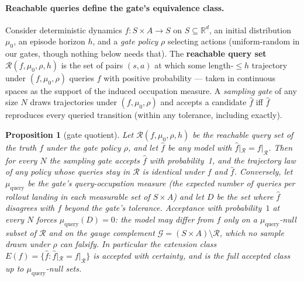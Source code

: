 \documentclass[11pt]{article}
\newtheorem{proposition}{Proposition}
\theoremstyle{remark}
\begin{document}
\paragraph{Reachable queries define the gate's equivalence class.}
Consider deterministic dynamics $f : S \times A \to S$ on
$S \subseteq \mathbb{R}^d$, an initial distribution $\mu_0$, an episode
horizon
$h$, and a \emph{gate policy} $\rho$ selecting actions (uniform-random in
our gates, though nothing below needs that). The \textbf{reachable query
set} $\mathcal{R}(f, \mu_0, \rho, h)$ is the set of pairs $(s, a)$ at
which some length-${\le}h$ trajectory under $(f, \mu_0, \rho)$ queries
$f$ with positive probability --- taken in continuous spaces as the support
of the induced occupation measure.
A \emph{sampling gate} of any size $N$ draws trajectories under
$(f, \mu_0, \rho)$ and accepts a candidate $\hat f$ iff $\hat f$
reproduces every queried transition (within any tolerance, including
exactly).

\begin{proposition}[gate quotient]
\label{prop:quotient}
Let $\mathcal{R}(f, \mu_0, \rho, h)$ be the reachable query set of the truth
$f$ under the gate policy $\rho$, and let $\hat f$ be any model with
$\hat f|_{\mathcal{R}} = f|_{\mathcal{R}}$. Then for every $N$ the sampling
gate accepts $\hat f$ with probability~1, and the trajectory law of any
policy whose queries stay in $\mathcal{R}$ is identical under $f$ and
$\hat f$. Conversely, let $\mu_{\mathrm{query}}$ be the gate's query-occupation
measure (the expected number of queries per rollout landing in each
measurable set of $S \times A$) and let $D$ be the set where $\hat f$
disagrees with $f$ beyond the gate's tolerance. Acceptance with
probability~$1$ at every $N$ forces $\mu_{\mathrm{query}}(D) = 0$: the
model may differ from $f$ only on a $\mu_{\mathrm{query}}$-null subset of
$\mathcal{R}$ and on the gauge complement
$\mathcal{G} = (S \times A) \setminus \mathcal{R}$, which no sample drawn
under $\rho$ can falsify. In particular the extension class
$E(f) = \{ \hat f : \hat f|_{\mathcal{R}} = f|_{\mathcal{R}} \}$ is
accepted with certainty, and is the full accepted class up to
$\mu_{\mathrm{query}}$-null sets.
\end{proposition}
\end{document}
